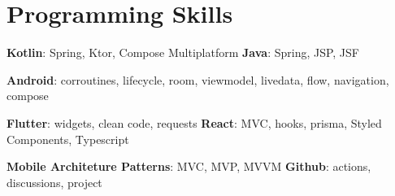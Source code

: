 \section{Programming Skills}
 \resumeSubHeadingListStart
   \item{
     \textbf{Kotlin}{: Spring, Ktor, Compose Multiplatform}
     \hfill
     \textbf{Java}{: Spring, JSP, JSF}
   }
   \item{
     \textbf{Android}{: corroutines, lifecycle, room, viewmodel, livedata, flow, navigation, compose}
   }
   \item{
     \textbf{Flutter}{: widgets, clean code, requests}
     \hfill
     \textbf{React}{: MVC, hooks, prisma, Styled Components, Typescript}
   }
   \item{
     \textbf{Mobile Architeture Patterns}{: MVC, MVP, MVVM}
     \hfill
     \textbf{Github}{: actions, discussions, project}
   }
 \resumeSubHeadingListEnd
